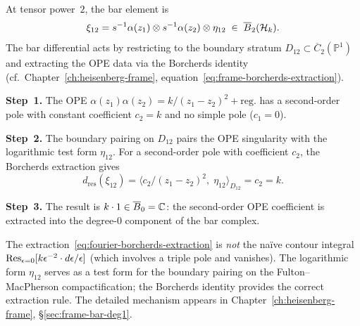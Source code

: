 \begin{computation}[\texorpdfstring{$n = 2$}{n = 2}; \ClaimStatusProvedHere]
\label{comp:fourier-heisenberg-n2}
At tensor power~$2$, the bar element is
\begin{equation}\label{eq:fourier-bar2-heisenberg}
\xi_{12} = s^{-1}\alpha(z_1) \otimes s^{-1}\alpha(z_2)
  \otimes \eta_{12}
\;\in\; \overline{B}_2(\mathcal{H}_k).
\end{equation}
The bar differential acts by restricting to the boundary stratum
$D_{12} \subset \overline{C}_2(\mathbb{P}^1)$ and extracting the
OPE data via the Borcherds identity
(cf.~Chapter~\ref{ch:heisenberg-frame},
equation~\eqref{eq:frame-borcherds-extraction}).

\medskip\noindent\textbf{Step~1.}
The OPE $\alpha(z_1)\alpha(z_2) = k/(z_1 - z_2)^2 + \text{reg.}$
has a second-order pole with constant coefficient $c_2 = k$ and no
simple pole ($c_1 = 0$).

\medskip\noindent\textbf{Step~2.}
The boundary pairing on $D_{12}$ pairs the OPE singularity with the
logarithmic test form $\eta_{12}$.  For a second-order pole with
coefficient $c_2$, the Borcherds extraction gives
\begin{equation}\label{eq:fourier-borcherds-extraction}
d_{\mathrm{res}}(\xi_{12})
= \bigl\langle c_2/(z_1 - z_2)^2,\; \eta_{12}
  \bigr\rangle_{D_{12}}
= c_2 = k.
\end{equation}

\medskip\noindent\textbf{Step~3.}
The result is $k \cdot 1 \in \overline{B}_0 = \mathbb{C}$: the
second-order OPE coefficient is extracted into the degree-$0$
component of the bar complex.
\end{computation}

\begin{remark}\label{rem:fourier-borcherds}
The extraction~\eqref{eq:fourier-borcherds-extraction} is
\emph{not} the na\"ive contour integral
$\operatorname{Res}_{\epsilon = 0}[k\epsilon^{-2} \cdot d\epsilon/\epsilon]$
(which involves a triple pole and vanishes).  The logarithmic form
$\eta_{12}$ serves as a test form for the boundary pairing on the
Fulton--MacPherson compactification; the Borcherds identity provides
the correct extraction rule.  The detailed mechanism appears in
Chapter~\ref{ch:heisenberg-frame},
\S\ref{sec:frame-bar-deg1}.
\end{remark}

